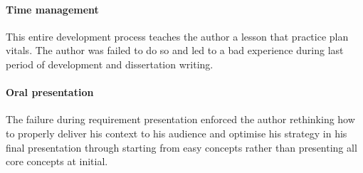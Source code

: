 \paragraph{Time management}
This entire development process teaches the author a lesson that practice
plan vitals. The author was failed to do so and led to a bad experience during
last period of development and dissertation writing.

\paragraph{Oral presentation}
The failure during requirement presentation enforced the author rethinking how to
properly deliver his context to his audience and optimise his strategy in his final
presentation through starting from easy concepts rather than presenting all core concepts at initial.
